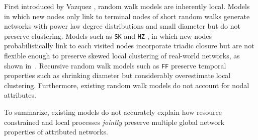 First introduced by Vazquez \cite{vazquez2000knowing}, random walk models are inherently local.
Models \cite{blum2006random} in which
new nodes only link to terminal nodes of short random walks generate
networks with power law degree distributions \cite{chebolu2008pagerank} and
small diameter \cite{mehrabian2016sa} but do not preserve clustering. Models
such as \texttt{SK} \cite{saramaki2004scale}
and \texttt{HZ} \cite{herrera2011generating}, in which new nodes probabilistically link to
each visited nodes incorporate triadic closure but are not flexible enough to preserve
{skewed} local clustering of real-world networks, as shown in~.
Recursive random walk models such as \texttt{FF} \cite{leskovec2005graphs}
preserve temporal properties such as shrinking diameter but considerably overestimate local clustering.
Furthermore, existing random walk models do not account for nodal attributes.


To summarize, existing models do not accurately explain how resource constrained and local processes
\textit{jointly} preserve multiple global network properties of attributed networks.



